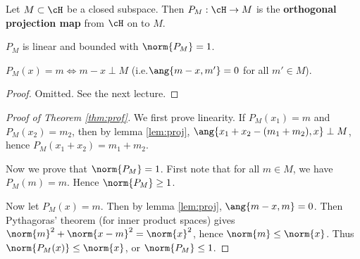 \begin{defn}
	Let $M \subset \cH$ be a closed subspace.
	Then $P_M: \cH \to M$ is the \textbf{orthogonal projection map} from $\cH$ on to $M$.
\end{defn}

\begin{thm}\label{thm:prof}
	$P_M$ is linear and bounded with $\norm{P_M}=1$.
\end{thm}

\begin{lem}\label{lem:proj}
	$P_M(x)=m \iff m-x \perp M$ (i.e.\@ $\ang{m-x,m'}=0$ for all $m' \in M$).
\end{lem}

\begin{proof}
	Omitted.
	See the next lecture.
\end{proof}

\begin{proof}[Proof of Theorem \ref{thm:prof}]
	We first prove linearity.
	If $P_M(x_1)=m$ and $P_M(x_2)=m_2$, then by lemma \ref{lem:proj}, $\ang{x_1+x_2-(m_1+m_2),x} \perp M$, hence $P_M(x_1+x_2)=m_1+m_2$.
	
	Now we prove that $\norm{P_M}=1$.
	First note that for all $m \in M$, we have $P_M(m)=m$.
	Hence $\norm{P_M} \geq 1$.
	
	Now let $P_M(x)=m$.
	Then by lemma \ref{lem:proj}, $\ang{m-x,m}=0$.
	Then Pythagoras' theorem (for inner product spaces) gives $\norm{m}^2 + \norm{x-m}^2 = \norm{x}^2$, hence $\norm{m} \leq \norm{x}$.
	Thus $\norm{P_M(x)} \leq \norm{x}$, or $\norm{P_M} \leq 1$.
\end{proof}